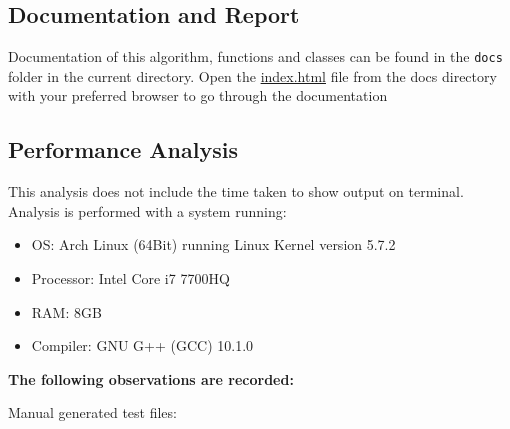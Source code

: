 \hypertarget{documentation-and-report}{%
\subsection{Documentation and Report}\label{documentation-and-report}}

Documentation of this algorithm, functions and classes can be found in
the \texttt{docs} folder in the current directory. Open the
\href{../DCEL/docs/html/index.html}{index.html} file from the docs
directory with your preferred browser to go through the documentation

\hypertarget{performance-analysis}{%
\subsection{Performance Analysis}\label{performance-analysis}}

This analysis does not include the time taken to show output on
terminal. Analysis is performed with a system running:

\begin{itemize}
\tightlist
\item
  OS: Arch Linux (64Bit) running Linux Kernel version 5.7.2
\item
  Processor: Intel Core i7 7700HQ
\item
  RAM: 8GB
\item
  Compiler: GNU G++ (GCC) 10.1.0
\end{itemize}

\textbf{The following observations are recorded:}

Manual generated test files:

